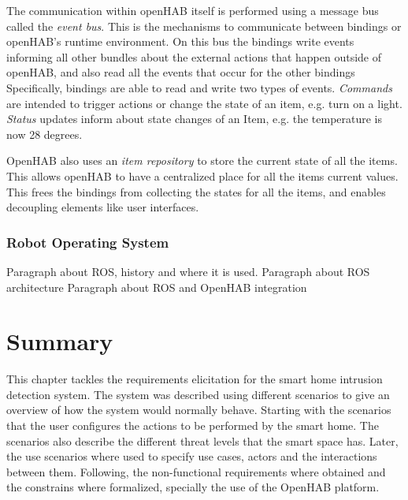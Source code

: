 The communication within openHAB itself is performed using a message bus called the \textit{event bus}. This is the mechanisms to communicate between bindings or openHAB's runtime environment. On this bus the bindings write events informing all other bundles about the external actions that happen outside of openHAB, and also read all the events that occur for the other bindings \\
Specifically, bindings are able to read and write two types of events. \textit{Commands} are intended to trigger actions or change the state of an item, e.g. turn on a light. \textit{Status} updates inform about state changes of an Item, e.g. the temperature is now 28 degrees\cite{openhabBinding}.

OpenHAB also uses an \textit{item repository} to store the current state of all the items. This allows openHAB to have a centralized place for all the items current values. This frees the bindings from collecting the states for all the items, and enables decoupling elements like user interfaces\cite{openhabBinding}.

\subsubsection{Robot Operating System}
Paragraph about ROS, history and where it is used.
Paragraph about ROS architecture
Paragraph about ROS and OpenHAB integration

\section{Summary}
This chapter tackles the requirements elicitation for the smart home intrusion detection system. The system was described using different scenarios to give an overview of how the system would normally behave. Starting with the scenarios that the user configures the actions to be performed by the smart home. The scenarios also describe the different threat levels that the smart space has. Later, the use scenarios where  used to specify use cases, actors and the interactions between them. Following, the non-functional requirements where obtained and the constrains where formalized, specially the use of the OpenHAB platform. 
